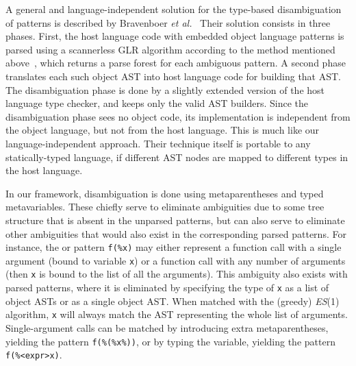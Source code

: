 A general and language\hyp{}independent solution for the
type\hyp{}based disambiguation of patterns is described by Bravenboer
\emph{et al.}~\cite{type-disambig} Their solution consists in three
phases. First, the host language code with embedded object language
patterns is parsed using a scannerless GLR algorithm according to the
method mentioned above~\cite{metaprog}, which returns a parse forest
for each ambiguous pattern. A second phase translates each such object
AST into host language code for building that AST. The disambiguation
phase is done by a slightly extended version of the host language type
checker, and keeps only the valid AST builders. Since the
disambiguation phase sees no object code, its implementation is
independent from the object language, but not from the host
language. This is much like our language\hyp{}independent
approach. Their technique itself is portable to any
statically\hyp{}typed language, if different AST nodes are mapped to
different types in the host language.

In our framework, disambiguation is done using meta\-parentheses and
typed meta\-variables. These chiefly serve to eliminate ambiguities
due to some tree structure that is absent in the unparsed patterns,
but can also serve to eliminate other ambiguities that would also
exist in the corresponding parsed patterns. For instance, the \Clang
or \Java pattern \texttt{f(\%x)} may either represent a function call
with a single argument (bound to variable \texttt{x}) or a function
call with any number of arguments (then \texttt{x} is bound to the
list of all the arguments). This ambiguity also exists with parsed
patterns, where it is eliminated by specifying the type of \texttt{x}
as a list of object ASTs or as a single object AST. When matched with
the (greedy) \textit{ES}(1) algorithm, \texttt{x} will always match
the AST representing the whole list of arguments.
Single\hyp{}argument calls can be matched by introducing extra
meta\-parentheses, yielding the pattern \texttt{f(\%(\%x\%))}, or by
typing the variable, yielding the pattern \texttt{f(\%<expr>x)}.
